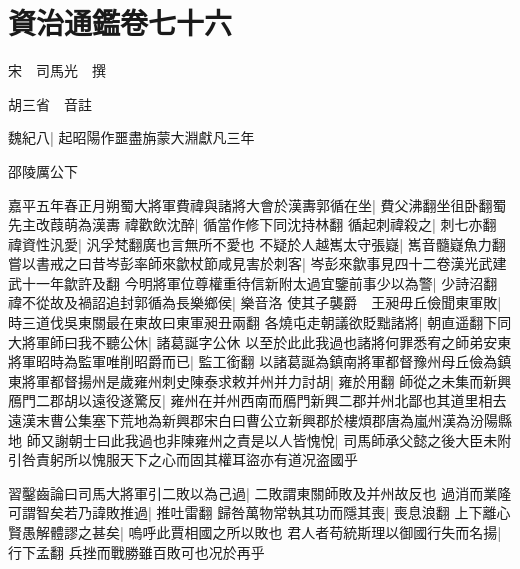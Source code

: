 \chapter{資治通鑑卷七十六}
宋　司馬光　撰

胡三省　音註

魏紀八|{
	起昭陽作噩盡旃蒙大淵獻凡三年}


邵陵厲公下

嘉平五年春正月朔蜀大將軍費禕與諸將大會於漢夀郭循在坐|{
	費父沸翻坐徂卧翻蜀先主改葭萌為漢夀}
禕歡飲沈醉|{
	循當作修下同沈持林翻}
循起刺禕殺之|{
	刺七亦翻}
禕資性汎愛|{
	汎孚梵翻廣也言無所不愛也}
不疑於人越嶲太守張嶷|{
	嶲音髓嶷魚力翻}
嘗以書戒之曰昔岑彭率師來歙杖節咸見害於刺客|{
	岑彭來歙事見四十二卷漢光武建武十一年歙許及翻}
今明將軍位尊權重待信新附太過宜鑒前事少以為警|{
	少詩沼翻}
禕不從故及禍詔追封郭循為長樂鄉侯|{
	樂音洛}
使其子襲爵　王昶毋丘儉聞東軍敗|{
	時三道伐吳東關最在東故曰東軍昶丑兩翻}
各燒屯走朝議欲貶黜諸將|{
	朝直遥翻下同}
大將軍師曰我不聽公休|{
	諸葛誕字公休}
以至於此此我過也諸將何罪悉宥之師弟安東將軍昭時為監軍唯削昭爵而已|{
	監工銜翻}
以諸葛誕為鎮南將軍都督豫州母丘儉為鎮東將軍都督揚州是歲雍州刺史陳泰求敕并州并力討胡|{
	雍於用翻}
師從之未集而新興鴈門二郡胡以遠役遂驚反|{
	雍州在并州西南而鴈門新興二郡并州北鄙也其道里相去遠漢末曹公集塞下荒地為新興郡宋白曰曹公立新興郡於樓煩郡唐為嵐州漢為汾陽縣地}
師又謝朝士曰此我過也非陳雍州之責是以人皆愧悅|{
	司馬師承父懿之後大臣未附引咎責躬所以愧服天下之心而固其權耳盜亦有道况盗國乎}


習鑿齒論曰司馬大將軍引二敗以為己過|{
	二敗謂東關師敗及并州故反也}
過消而業隆可謂智矣若乃諱敗推過|{
	推吐雷翻}
歸咎萬物常執其功而隱其喪|{
	喪息浪翻}
上下離心賢愚解體謬之甚矣|{
	嗚呼此賈相國之所以敗也}
君人者苟統斯理以御國行失而名揚|{
	行下孟翻}
兵挫而戰勝雖百敗可也况於再乎


